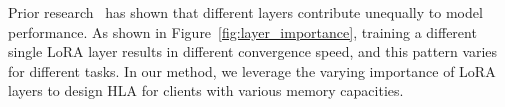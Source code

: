 \documentclass[lettersize,journal]{IEEEtran}
\begin{document}
{
Prior research~\cite{chen2022layer, ardakani2024slimfit,lodha2023surgical,pan2024lisa,gao2024higher,wang2020infinicache} has shown that different layers contribute unequally to model performance. As shown in Figure~\ref{fig:layer_importance}, training a different single LoRA layer results in different convergence speed, and this pattern varies for different tasks. 
%
In our method, we leverage the varying importance of LoRA layers to design HLA for clients with various memory capacities.}
% 

\end{document}
